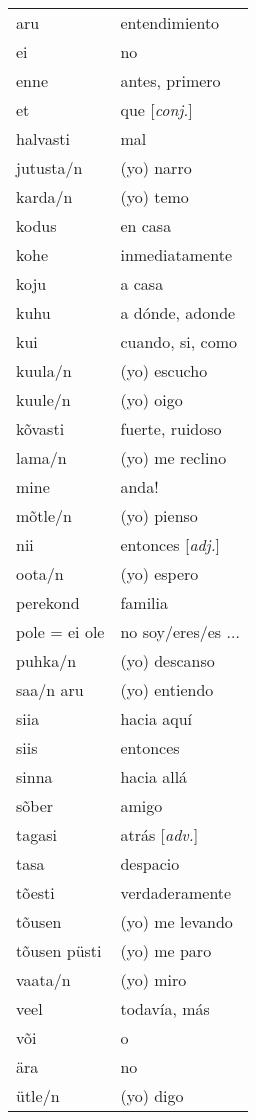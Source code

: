 \begin{tabular}{ l l }
	aru				& entendimiento \\
	ei				& no \\
	enne			& antes, primero \\
	et				& que [\emph{conj.}] \\
	halvasti		& mal \\
	jutusta/n		& (yo) narro \\
	karda/n			& (yo) temo \\
	kodus			& en casa \\
	kohe			& inmediatamente \\
	koju			& a casa \\
	kuhu			& a dónde, adonde \\
	kui				& cuando, si, como \\
	kuula/n			& (yo) escucho \\
	kuule/n			& (yo) oigo \\
	kõvasti			& fuerte, ruidoso \\
	lama/n			& (yo) me reclino \\
	mine			& anda! \\
	mõtle/n			& (yo) pienso \\ 
	nii				& entonces [\emph{adj.}] \\
	oota/n			& (yo) espero \\ 
	perekond		& familia \\
	pole = ei ole	& no soy/eres/es ... \\
	puhka/n			& (yo) descanso \\
	saa/n aru		& (yo) entiendo \\ 
	siia			& hacia aquí \\
	siis 			& entonces \\	
	sinna			& hacia allá \\ 
	sõber			& amigo  \\
	tagasi			& atrás [\emph{adv.}] \\
	tasa			& despacio \\
	tõesti			& verdaderamente \\
	tõusen			& (yo) me levando \\
	tõusen püsti	& (yo) me paro \\
	vaata/n			& (yo) miro \\
	veel			& todavía, más \\
	või				& o \\
	ära				& no \\
	ütle/n			& (yo) digo
\end{tabular}


